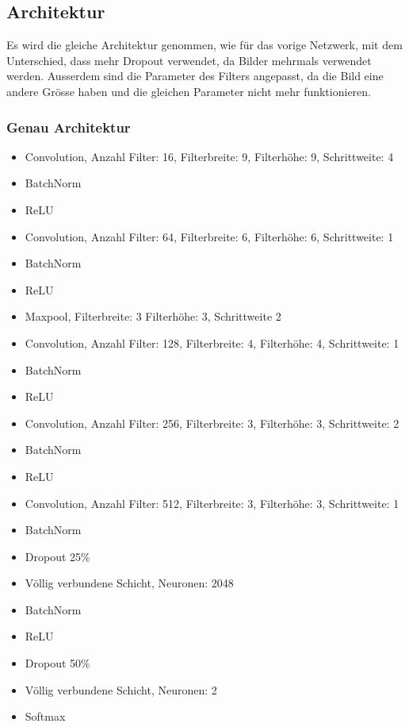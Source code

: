 \documentclass[12pt,a4paper]{report}
\begin{document}
\subsection{Architektur}
Es wird die gleiche Architektur genommen, wie für das vorige Netzwerk, mit dem Unterschied,
dass mehr Dropout verwendet, da Bilder mehrmals verwendet werden.
Ausserdem sind die Parameter des Filters angepasst, da die Bild eine andere Grösse haben und die gleichen Parameter nicht mehr funktionieren.
\subsubsection{Genau Architektur}

\begin{itemize}
    \setlength\itemsep{0cm}
    \setlength{\parskip}{0pt}
    \setlength{\parsep}{0pt}
    \item Convolution, Anzahl Filter: 16, Filterbreite: 9, Filterhöhe: 9, Schrittweite: 4
    \item BatchNorm
    \item ReLU
    \item Convolution, Anzahl Filter: 64, Filterbreite: 6, Filterhöhe: 6, Schrittweite: 1
    \item BatchNorm
    \item ReLU
    \item Maxpool, Filterbreite: 3 Filterhöhe: 3, Schrittweite 2
    \item Convolution, Anzahl Filter: 128, Filterbreite: 4, Filterhöhe: 4, Schrittweite: 1
    \item BatchNorm
    \item ReLU
    \item Convolution, Anzahl Filter: 256, Filterbreite: 3, Filterhöhe: 3, Schrittweite: 2
    \item BatchNorm
    \item ReLU
    \item Convolution, Anzahl Filter: 512, Filterbreite: 3, Filterhöhe: 3, Schrittweite: 1
    \item BatchNorm
    \item Dropout 25\%
    \item Völlig verbundene Schicht, Neuronen: 2048
    \item BatchNorm
    \item ReLU
    \item Dropout 50\%
    \item Völlig verbundene Schicht, Neuronen: 2
    \item Softmax
\end{itemize}
\end{document}
